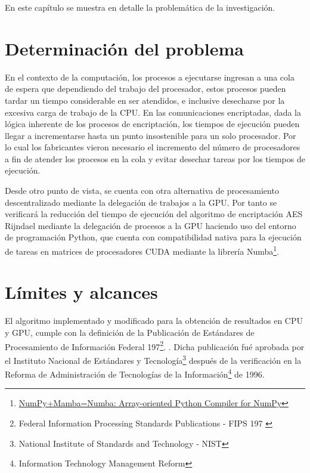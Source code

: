 \documentclass[../main/main.tex]{subfiles}
\begin{document}
\espacio

  En este capítulo se muestra en detalle la problemática de la investigación.

  \section{Determinación del problema}

  En el contexto de la computación, los procesos a ejecutarse ingresan a una cola de espera que dependiendo del trabajo del procesador, estos procesos pueden tardar un tiempo considerable en ser atendidos, e inclusive desecharse por la excesiva carga de trabajo de la CPU. En las comunicaciones encriptadas, dada la lógica inherente de los procesos de encriptación, los tiempos de ejecución pueden llegar a incrementarse hasta un punto insostenible para un solo procesador. Por lo cual los fabricantes vieron necesario el incremento del número de procesadores a fin de atender los procesos en la cola y evitar desechar tareas por los tiempos de ejecución.

  Desde otro punto de vista, se cuenta con otra alternativa de procesamiento descentralizado mediante la delegación de trabajos a la GPU. Por tanto se verificará la reducción del tiempo de ejecución del algoritmo de encriptación AES Rijndael mediante la delegación de procesos a la GPU haciendo uso del entorno de programación Python, que cuenta con compatibilidad nativa para la ejecución de tareas en matrices de procesadores CUDA mediante la librería Numba\footnote{\href{http://numba.pydata.org/numba-doc/latest/cuda/index.html}{NumPy+Mamba=Numba: Array-oriented Python Compiler for NumPy}}.

  \section{Límites y alcances}

  El algoritmo implementado y modificado para la obtención de resultados en CPU y GPU, cumple con la definición de la Publicación de Estándares de Procesamiento de Información Federal 197\footnote{Federal Information Processing Standards Publications - FIPS 197 \cite{report:FIPS_197}}. \cite{report:FIPS_197}. Dicha publicación fué aprobada por el Instituto Nacional de Estándares y Tecnología\footnote{National Institute of Standards and Technology - NIST} después de la verificación en la Reforma de Administración de Tecnologías de la Información\footnote{Information Technology Management Reform} de 1996.
\end{document}
